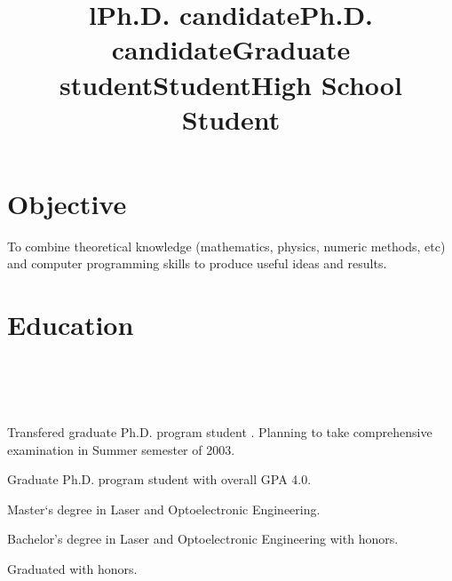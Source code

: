 \documentclass[10pt,overlapped,line]{res}
\begin{document}
\begin{resume}

\section{Objective} 
To combine theoretical knowledge (mathematics, physics, numeric
methods, etc) and computer programming skills to produce useful ideas
and results. 
   
\section{Education}
\begin{format}
  \title{l}\\
  \\
  \body\\
\end{format}

\title{Ph.D. candidate}
\begin{position}
  Transfered graduate Ph.D. program student
. Planning to take comprehensive examination in Summer semester of 2003.
\end{position}


\title{Ph.D. candidate}
\begin{position}
  Graduate Ph.D. program student with overall GPA 4.0. 
\end{position}

\title{Graduate student}
\begin{position}
 Master`s degree in Laser and Optoelectronic Engineering.
\end{position}

\title{Student}
\begin{position}
 Bachelor's degree in Laser and Optoelectronic Engineering with
 honors.
\end{position}

\title{High School Student}
\begin{position}
 Graduated with honors.
\end{position}


\end{resume}
\end{document}
